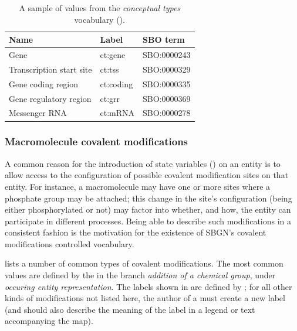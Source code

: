 \begin{table}[htb]
  \centering
  \begin{tabular}{l>{\ttfamily}l>{\ttfamily}l}
    \toprule
    \textbf{Name}              & \textbf{\rmfamily Label} & \textbf{\rmfamily SBO term} \\
    \midrule
    Gene                      & ct:gene   & SBO:0000243\\
    Transcription start site  & ct:tss    & SBO:0000329\\
    Gene coding region        & ct:coding & SBO:0000335\\
    Gene regulatory region    & ct:grr    & SBO:0000369\\
    Messenger RNA             & ct:mRNA   & SBO:0000278\\
    \bottomrule
  \end{tabular}
  \caption{A sample of values from the \emph{conceptual types} vocabulary
    ().}
  \label{tab:conceptual-types-cv}
\end{table}


\subsubsection{Macromolecule covalent modifications}
\label{sec:covalent-mod-cv}

A common reason for the introduction of state variables () on an entity is to allow access to the configuration of possible covalent modification sites on that entity.  For instance, a macromolecule may have one or more sites where a phosphate group may be attached; this change in the site's configuration (\ie being either phosphorylated or not) may factor into whether, and how, the entity can participate in different processes.  Being able to describe such modifications in a consistent fashion is the motivation for the existence of SBGN's covalent modifications controlled vocabulary.  

 lists a number of common types of covalent modifications.  The most common values are defined by the \sbo in the branch \emph{addition of a chemical group}, under \emph{occuring entity representation}. The labels shown in  are defined by \SBGNPDLone; for all other kinds of modifications not listed here, the author of a \PD must create a new label (and should also describe the meaning of the label in a legend or text accompanying the map).

